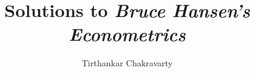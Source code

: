 \documentclass{report}
\title{Solutions to \emph{Bruce Hansen's Econometrics}}
\author{Tirthankar Chakravarty}
\begin{document}
\maketitle
\newpage
\tableofcontents

\begin{versionhistory}
\end{versionhistory}




\end{document}
